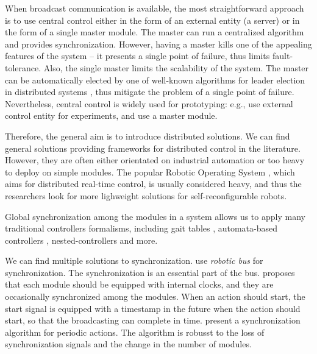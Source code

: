 \bigskip

When broadcast communication is available, the most straightforward approach is
to use central control either in the form of an external entity (a server) or in
the form of a single master module. The master can run a centralized algorithm
and provides synchronization. However, having a master kills one of the
appealing features of the system -- it presents a single point of failure, thus
limits fault-tolerance. Also, the single master limits the scalability of the
system. The master can be automatically elected by one of well-known algorithms
for leader election in distributed systems \cite{baca2016coordination}, thus
mitigate the problem of a single point of failure. Nevertheless, central control
is widely used for prototyping: e.g., \cite{DBLP:journals/ijrr/KurokawaTKKHM08,
DBLP:conf/icra/TosunDJKCY18} use external control entity for experiments, and
\cite{superbotroller} use a master module.

Therefore, the general aim is to introduce distributed solutions. We can find
general solutions providing frameworks for distributed control in the
literature. However, they are often either orientated on industrial automation
or too heavy to deploy on simple modules. The popular Robotic Operating System
\cite{DBLP:journals/corr/abs-1809-02595}, which aims for distributed real-time
control, is usually considered heavy, and thus the researchers look for more
lighweight solutions for self-reconfigurable robots.

Global synchronization among the modules in a system allows us to apply many
traditional controllers formalisms, including gait tables
\cite{DBLP:conf/icarcv/KurokawaKYTMK02, DBLP:conf/iros/YimSSPDT07a},
automata-based controllers \cite{DBLP:journals/procedia/PouyaAMI11,
DBLP:journals/arobots/JingTYK18}, nested-controllers \cite{1159219} and more.

We can find multiple solutions to synchronization.
\textcite{DBLP:journals/ijrr/ParkCTY08} use \emph{robotic bus} \cite{roboticbus}
for synchronization. The synchronization is an essential part of the bus.
\textcite{yim1994locomotion} proposes that each module should be equipped with
internal clocks, and they are occasionally synchronized among the modules. When
an action should start, the start signal is equipped with a timestamp in the
future when the action should start, so that the broadcasting can complete in
time. \textcite{stoy2002global} present a synchronization algorithm for periodic
actions. The algorithm is robusst to the loss of synchronization signals and the
change in the number of modules.

